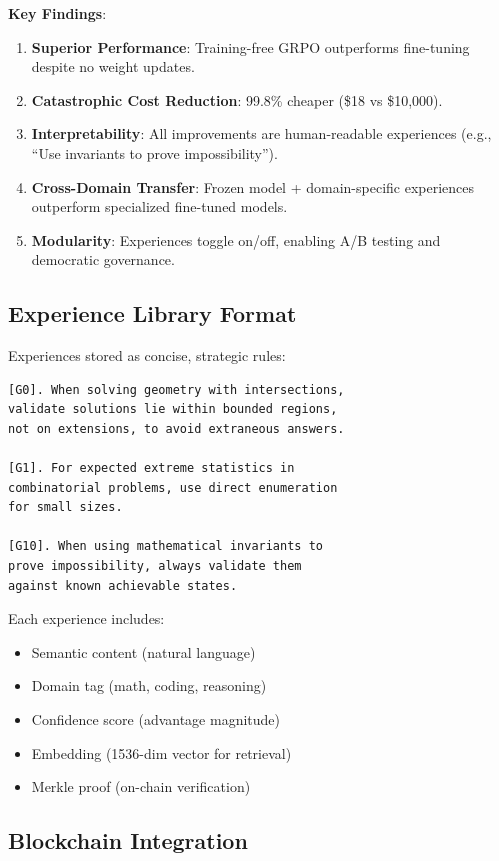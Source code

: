 \textbf{Key Findings}:
\begin{enumerate}
    \item \textbf{Superior Performance}: Training-free GRPO outperforms fine-tuning despite no weight updates.
    \item \textbf{Catastrophic Cost Reduction}: 99.8\% cheaper (\$18 vs \$10,000).
    \item \textbf{Interpretability}: All improvements are human-readable experiences (e.g., ``Use invariants to prove impossibility'').
    \item \textbf{Cross-Domain Transfer}: Frozen model + domain-specific experiences outperform specialized fine-tuned models.
    \item \textbf{Modularity}: Experiences toggle on/off, enabling A/B testing and democratic governance.
\end{enumerate}

\subsection{Experience Library Format}

Experiences stored as concise, strategic rules:

\begin{verbatim}
[G0]. When solving geometry with intersections,
validate solutions lie within bounded regions,
not on extensions, to avoid extraneous answers.

[G1]. For expected extreme statistics in
combinatorial problems, use direct enumeration
for small sizes.

[G10]. When using mathematical invariants to
prove impossibility, always validate them
against known achievable states.
\end{verbatim}

Each experience includes:
\begin{itemize}
    \item Semantic content (natural language)
    \item Domain tag (math, coding, reasoning)
    \item Confidence score (advantage magnitude)
    \item Embedding (1536-dim vector for retrieval)
    \item Merkle proof (on-chain verification)
\end{itemize}

\subsection{Blockchain Integration}

